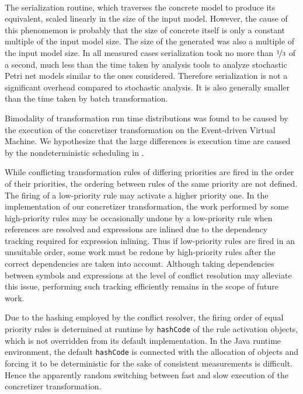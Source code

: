 \paragraph{} The  serialization routine, which traverses the concrete  model to produce its  equivalent, scaled linearly in the size of the input model. However, the cause of this phenomemon is probably that the size of concrete  itself is only a constant multiple of the input model size. The size of the generated  was also a multiple of the input model size. In all measured cases  serialization took no more than \(\nicefrac{1}{3}\) of a second, much less than the time taken by analysis tools to analyze stochastic Petri net models similar to the ones considered. Therefore  serialization is not a significant overhead compared to stochastic analysis. It is also generally smaller than the time taken by batch transformation.

\newpara Bimodality of transformation run time distributions was found to be caused by the execution of the  concretizer transformation on the  Event-driven Virtual Machine. We hypothesize that the large differences is execution time are caused by the nondeterministic scheduling in .

While conflicting transformation rules of differing priorities are fired in the order of their priorities, the ordering between rules of the same priority are not defined. The firing of a low-priority rule may activate a higher priority one. In the implementation of our concretizer transformation, the work performed by some high-priority rules may be occasionally undone by a low-priority rule when  references are resolved and expressions are inlined due to the dependency tracking required for expression inlining. Thus if low-priority rules are fired in an unsuitable order, some work must be redone by high-priority rules after the correct dependencies are taken into account. Although taking dependencies between  symbols and expressions at the level of  conflict resolution may alleviate this issue, performing such tracking efficiently remains in the scope of future work.

Due to the hashing employed by the conflict resolver, the firing order of equal priority rules is determined at runtime by \texttt{hashCode} of the rule activation objects, which is not overridden from its default implementation. In the Java runtime environment, the default \texttt{hashCode} is connected with the allocation of objects and forcing it to be deterministic for the sake of consistent measurements is difficult. Hence the apparently random switching between fast and slow execution of the concretizer transformation.

